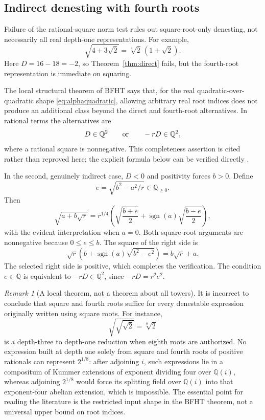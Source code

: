 \documentclass[11pt,letterpaper]{article}
\numberwithin{equation}{section}
\theoremstyle{definition}
\theoremstyle{remark}
\newtheorem{remark}[theorem]{Remark}
\newcommand{\Q}{\mathbb{Q}}
\newcommand{\sgn}{\operatorname{sgn}}
\begin{document}
\subsection{Indirect denesting with fourth roots}\label{sec:indirect}
Failure of the rational-square norm test rules out square-root-only denesting, not necessarily all real depth-one representations. For example,
\begin{equation}\label{eq:indirectexample}
\sqrt{4+3\sqrt2}=\sqrt[4]2\,(1+\sqrt2).
\end{equation}
Here $D=16-18=-2$, so Theorem~\ref{thm:direct} fails, but the fourth-root representation is immediate on squaring.

The local structural theorem of BFHT says that, for the real quadratic-over-quadratic shape \eqref{eq:alphaquadratic}, allowing arbitrary real root indices does not produce an additional class beyond the direct and fourth-root alternatives. In rational terms the alternatives are
\begin{equation}\label{eq:indirectcriterion}
D\in\Q^2\qquad\hbox{or}\qquad -rD\in\Q^2,
\end{equation}
where a rational square is nonnegative. This completeness assertion is cited rather than reproved here; the explicit formula below can be verified directly \cite{bfht,gkioulekas}.

In the second, genuinely indirect case, $D<0$ and positivity forces $b>0$. Define
\[
e=\sqrt{b^2-a^2/r}\in\Q_{\ge0}.
\]
Then
\begin{equation}\label{eq:indirect}
\sqrt{a+b\sqrt r}=r^{1/4}
\left(\sqrt{\frac{b+e}{2}}+
\sgn(a)\sqrt{\frac{b-e}{2}}\right),
\end{equation}
with the evident interpretation when $a=0$. Both square-root arguments are nonnegative because $0\le e\le b$. The square of the right side is
\[
\sqrt r\left(b+\sgn(a)\sqrt{b^2-e^2}\right)
=b\sqrt r+a.
\]
The selected right side is positive, which completes the verification. The condition $e\in\Q$ is equivalent to $-rD\in\Q^2$, since $-rD=r^2e^2$.

\begin{remark}[A local theorem, not a theorem about all towers]
It is incorrect to conclude that square and fourth roots suffice for every denestable expression originally written using square roots. For instance,
\[
\sqrt{\sqrt{\sqrt2}}=\sqrt[8]2
\]
is a depth-three to depth-one reduction when eighth roots are authorized. No expression built at depth one solely from square and fourth roots of positive rationals can represent $2^{1/8}$: after adjoining $i$, such expressions lie in a compositum of Kummer extensions of exponent dividing four over $\Q(i)$, whereas adjoining $2^{1/8}$ would force its splitting field over $\Q(i)$ into that exponent-four abelian extension, which is impossible. The essential point for reading the literature is the restricted input shape in the BFHT theorem, not a universal upper bound on root indices.
\end{remark}
\end{document}
